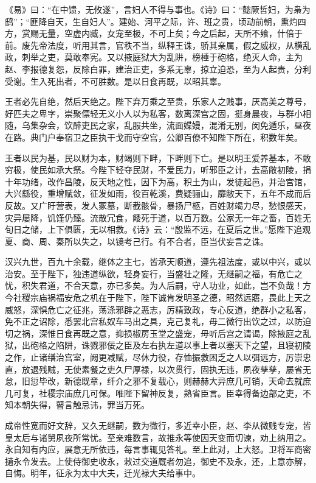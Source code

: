 \documentclass[12pt,UTF8]{ctexbook}
\begin{document}
《易》曰：“在中馈，无攸遂”，言妇人不得与事也。《诗》曰：“懿厥哲妇，为枭为鸱”；“匪降自天，生自妇人”。建始、河平之际，许、班之贵，顷动前朝，熏灼四方，赏赐无量，空虚内臧，女宠至极，不可上矣；今之后起，天所不飨，什倍于前。废先帝法度，听用其言，官秩不当，纵释王诛，骄其亲属，假之威权，从横乱政，刺举之吏，莫敢奉宪。又以掖庭狱大为乱阱，榜棰于砲格，绝灭人命，主为赵、李报德复怨，反除白罪，建治正吏，多系无辜，掠立迫恐，至为人起责，分利受谢。生入死出者，不可胜数。是以日食再既，以昭其辜。



王者必先自绝，然后天绝之。陛下弃万乘之至贵，乐家人之贱事，厌高美之尊号，好匹夫之卑字，崇聚僄轻无义小人以为私客，数离深宫之固，挺身晨夜，与群小相随，乌集杂会，饮醉吏民之家，乱服共坐，流面媟嫚，混淆无别，闵免遁乐，昼夜在路。典门户奉宿卫之臣执干戈而守空宫，公卿百僚不知陛下所在，积数年矣。



王者以民为基，民以财为本，财竭则下畔，下畔则下亡。是以明王爱养基本，不敢穷极，使民如承大祭。今陛下轻夺民财，不爱民力，听邪臣之计，去高敞初陵，捐十年功绪，改作昌陵，反天地之性，因下为高，积土为山，发徒起邑，并治宫馆，大兴繇役，重增赋敛，征发如雨，役百乾溪，费疑骊山，靡敝天下，五年不成而后反故。又广盱营表，发人冢墓，断截骸骨，暴扬尸柩，百姓财竭力尽，愁恨感天，灾异屡降，饥馑仍臻。流散冗食，餧死于道，以百万数。公家无一年之畜，百姓无旬日之储，上下俱匮，无以相救。《诗》云：“殷监不远，在夏后之世。”愿陛下追观夏、商、周、秦所以失之，以镜考己行。有不合者，臣当伏妄言之诛。



汉兴九世，百九十余载，继体之主七，皆承天顺道，遵先祖法度，或以中兴，或以治安。至于陛下，独违道纵欲，轻身妄行，当盛壮之隆，无继嗣之福，有危亡之忧，积失君道，不合天意，亦已多矣。为人后嗣，守人功业，如此，岂不负哉！方今社稷宗庙祸福安危之机在于陛下，陛下诚肯发明圣之德，昭然远寤，畏此上天之威怒，深惧危亡之征兆，荡涤邪辟之恶志，厉精致政，专心反道，绝群小之私客，免不正之诏除，悉罢北宫私奴车马出之具，克己复礼，毋二微行出饮之过，以防迫切之祸，深惟日食再既之意，抑损椒房玉堂之盛宠，毋听后宫之请谒，除掖庭之乱狱，出砲格之陷阱，诛戮邪佞之臣及左右执左道以事上者以塞天下之望，且寝初陵之作，止诸缮治宫室，阙更减赋，尽休力役，存恤振救困乏之人以弭远方，厉崇忠直，放退残贼，无使素餐之吏久尸厚禄，以次贯行，固执无违，夙夜孳孳，屡省无怠，旧愆毕改，新德既章，纤介之邪不复载心，则赫赫大异庶几可销，天命去就庶几可复，社稷宗庙庶几可保。唯陛下留神反复，熟省臣言。臣幸得备边部之吏，不知本朝失得，瞽言触忌讳，罪当万死。



成帝性宽而好文辞，又久无继嗣，数为微行，多近幸小臣，赵、李从微贱专宠，皆皇太后与诸舅夙夜所常忧。至亲难数言，故推永等使因天变而切谏，劝上纳用之。永自知有内应，展意无所依违，每言事辄见答礼。至上此对，上大怒。卫将军商密擿永令发去。上使侍御史收永，敕过交道厩者勿追，御史不及永，还，上意亦解，自悔。明年，征永为太中大夫，迁光禄大夫给事中。
\end{document}

